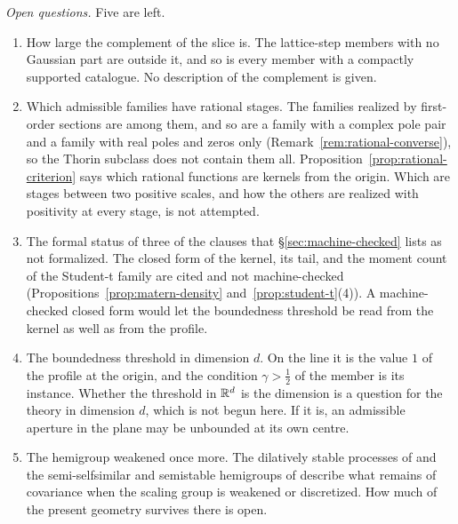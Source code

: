 \emph{Open questions.} Five are left.
\begin{enumerate}
\item How large the complement of the slice is. The lattice-step members with no Gaussian part
are outside it, and so
is every member with a compactly supported catalogue. No description of the complement is
given.
\item Which admissible families have rational stages. The families realized by first-order
sections are among them, and so are a family with a complex pole pair and a family with real
poles and zeros only (Remark~\ref{rem:rational-converse}), so the Thorin subclass does not
contain them all. Proposition~\ref{prop:rational-criterion} says which rational functions are
kernels from the origin. Which are stages between two positive scales, and how the others are
realized with positivity at every stage, is not attempted.
\item The formal status of three of the clauses that \S\ref{sec:machine-checked} lists as not
formalized. The closed form of the \Matern{} kernel, its tail, and the moment count of the
Student-t family are cited and not machine-checked
(Propositions~\ref{prop:matern-density} and~\ref{prop:student-t}(4)). A machine-checked closed
form would let the boundedness threshold be read from the kernel as well as from the profile.
\item The boundedness threshold in dimension $d$. On the line it is the value $1$ of the
profile at the origin, and the condition $\gamma > \tfrac12$ of the \Matern{} member is its
instance. Whether the threshold in $\mathbb{R}^d$ is the dimension is a question for the theory in
dimension $d$, which is not begun here. If it is, an admissible aperture in the plane may be
unbounded at its own centre.
\item The hemigroup weakened once more. The dilatively stable processes of
 and the semi-selfsimilar and semistable hemigroups of
 describe what remains of covariance when the scaling group is
weakened or discretized. How much of the present geometry survives there is open.
\end{enumerate}
